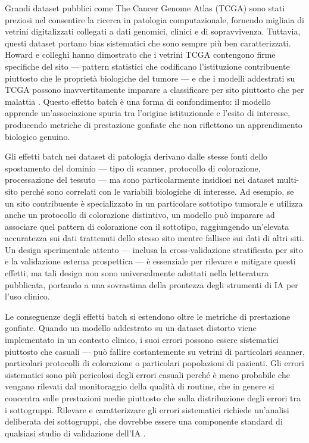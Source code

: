 Grandi dataset pubblici come The Cancer Genome Atlas (TCGA) sono stati preziosi nel consentire la ricerca in patologia computazionale, fornendo migliaia di vetrini digitalizzati collegati a dati genomici, clinici e di sopravvivenza. Tuttavia, questi dataset portano bias sistematici che sono sempre più ben caratterizzati. Howard e colleghi hanno dimostrato che i vetrini TCGA contengono firme specifiche del sito — pattern statistici che codificano l'istituzione contribuente piuttosto che le proprietà biologiche del tumore — e che i modelli addestrati su TCGA possono inavvertitamente imparare a classificare per sito piuttosto che per malattia \cite{howard2021}. Questo effetto batch è una forma di confondimento: il modello apprende un'associazione spuria tra l'origine istituzionale e l'esito di interesse, producendo metriche di prestazione gonfiate che non riflettono un apprendimento biologico genuino.

Gli effetti batch nei dataset di patologia derivano dalle stesse fonti dello spostamento del dominio — tipo di scanner, protocollo di colorazione, processazione del tessuto — ma sono particolarmente insidiosi nei dataset multi-sito perché sono correlati con le variabili biologiche di interesse. Ad esempio, se un sito contribuente è specializzato in un particolare sottotipo tumorale e utilizza anche un protocollo di colorazione distintivo, un modello può imparare ad associare quel pattern di colorazione con il sottotipo, raggiungendo un'elevata accuratezza sui dati trattenuti dello stesso sito mentre fallisce sui dati di altri siti. Un design sperimentale attento — inclusa la cross-validazione stratificata per sito e la validazione esterna prospettica — è essenziale per rilevare e mitigare questi effetti, ma tali design non sono universalmente adottati nella letteratura pubblicata, portando a una sovrastima della prontezza degli strumenti di IA per l'uso clinico.

Le conseguenze degli effetti batch si estendono oltre le metriche di prestazione gonfiate. Quando un modello addestrato su un dataset distorto viene implementato in un contesto clinico, i suoi errori possono essere sistematici piuttosto che casuali — può fallire costantemente su vetrini di particolari scanner, particolari protocolli di colorazione o particolari popolazioni di pazienti. Gli errori sistematici sono più pericolosi degli errori casuali perché è meno probabile che vengano rilevati dal monitoraggio della qualità di routine, che in genere si concentra sulle prestazioni medie piuttosto che sulla distribuzione degli errori tra i sottogruppi. Rilevare e caratterizzare gli errori sistematici richiede un'analisi deliberata dei sottogruppi, che dovrebbe essere una componente standard di qualsiasi studio di validazione dell'IA \cite{howard2021}.

